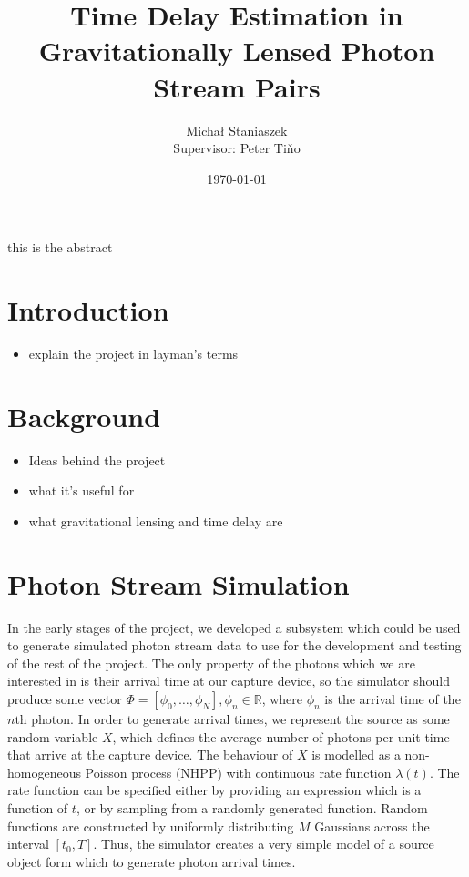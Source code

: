 \documentclass[a4paper,11pt]{article}
\title{Time Delay Estimation in Gravitationally Lensed Photon Stream Pairs}
\author{\Large{Micha{\l} Staniaszek} \\\small{Supervisor: Peter Ti{\v{n}}o}}
\date{\today}
\begin{document}
\maketitle


this is the abstract

\section{Introduction}
\label{sec-1}

\begin{itemize}
\item explain the project in layman's terms
\end{itemize}
\section{Background}
\label{sec-2}

\begin{itemize}
\item Ideas behind the project
\item what it's useful for
\item what gravitational lensing and time delay are
\end{itemize}
\section{Photon Stream Simulation}
\label{sec-3}

In the early stages of the project, we developed a subsystem which could be used
to generate simulated photon stream data to use for the development and testing
of the rest of the project. The only property of the photons which we are
interested in is their arrival time at our capture device, so the simulator
should produce some vector $\Phi=\left[\phi_0,\dots,\phi_N\right], \phi_n \in
\mathbb{R}$, where $\phi_n$ is the arrival time of the $n\text{th}$ photon. In
order to generate arrival times, we represent the source as some random variable
$X$, which defines the average number of photons per unit time that arrive at
the capture device. The behaviour of $X$ is modelled as a non-homogeneous
Poisson process (NHPP) with continuous rate function $\lambda(t)$. The rate
function can be specified either by providing an expression which is a function
of $t$, or by sampling from a randomly generated function. Random functions are
constructed by uniformly distributing $M$ Gaussians across the interval
$\left[t_0,T\right]$. Thus, the simulator creates a very simple model of a
source object form which to generate photon arrival times.
\end{document}
